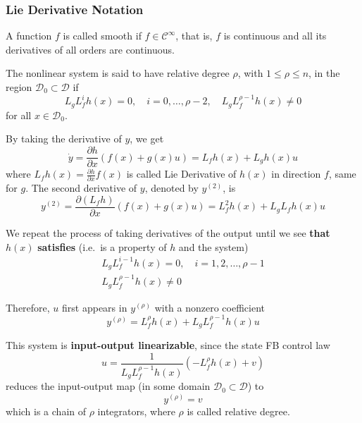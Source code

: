 \subsubsection{Lie Derivative Notation}

\newpar{}

A function $f$ is called smooth if $f \in \mathcal{C}^\infty$, that is, $f$ is continuous and all its derivatives of all orders are continuous.

\newpar{}

The nonlinear system is said to have relative degree $\rho$, with $1 \leq \rho \leq n$, in the region $\mathcal{D}_0 \subset \mathcal{D}$ if
\begin{equation*}
    L_g L_f^i h(x) = 0, \quad i = 0, \ldots, \rho - 2, \quad L_g L_f^{\rho - 1} h(x) \ne 0
\end{equation*}
for all $x \in \mathcal{D}_0$.

\newpar{}

By taking the derivative of $y$, we get
\begin{equation*}
    \dot{y} = \frac{\partial h}{\partial x}(f(x) + g(x)u) = L_f h(x) + L_g h(x) u
\end{equation*}
where $L_f h(x) = \frac{\partial h}{\partial x} f(x)$ is called Lie Derivative of $h(x)$ in direction $f$, same for $g$.
\newpar{}
The second derivative of $y$, denoted by $y^{(2)}$, is
\begin{equation*}
    y^{(2)} = \frac{\partial (L_f h)}{\partial x}(f(x) + g(x)u) = L_f^2 h(x) + L_g L_f h(x) u
\end{equation*}

We repeat the process of taking derivatives of the output until we see \textbf{that} $h(x)$ \textbf{satisfies} (i.e.\ is a property of $h$ and the system)
\begin{gather*}
    L_g L_f^{i-1} h(x) = 0, \quad i = 1, 2, \ldots, \rho - 1\\
    L_g L_f^{\rho - 1} h(x) \ne 0
\end{gather*}

Therefore, $u$ first appears in $y^{(\rho)}$ with a nonzero coefficient
\begin{equation*}
    y^{(\rho)} = L_f^\rho h(x) + L_g L_f^{\rho - 1} h(x) u
\end{equation*}

This system is \textbf{input-output linearizable}, since the state FB control law
\begin{equation*}
    u = \frac{1}{L_g L_f^{\rho - 1} h(x)}\left(-L_f^\rho h(x) + v\right)
\end{equation*}
reduces the input-output map (in some domain $\mathcal{D}_0 \subset \mathcal{D}$) to
\begin{equation*}
    y^{(\rho)} = v
\end{equation*}
which is a chain of $\rho$ integrators, where $\rho$ is called relative degree.

